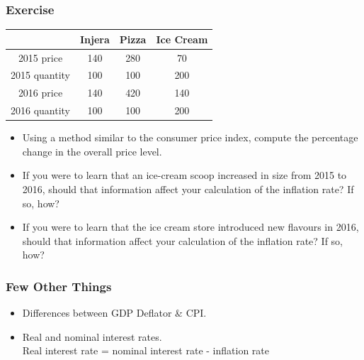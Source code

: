\documentclass[shownotes,11pt, aspectratio=169]{beamer}
\begin{document}
\begin{frame}
\frametitle{Exercise}
\linespread{1}
\begin{center}
\begin{tabular}{ cccc } 
 \hline
  & Injera & Pizza & Ice Cream \\
\hline
2015 price & 140 & 280 & 70 \\
2015 quantity & 100 & 100 & 200 \\
2016 price & 140 & 420 & 140  \\
2016 quantity & 100 & 100 & 200 \\
 \hline
\end{tabular}
\end{center}

\begin{itemize}
\item Using a method similar to the consumer price
index, compute the percentage change in the
overall price level. 

\item If you were to learn that an ice-cream scoop
increased in size from 2015 to 2016, should
that information affect your calculation of the
inflation rate? If so, how?

\item If you were to learn that the ice cream store introduced
new flavours in 2016, should that information
affect your calculation of the inflation rate? If
so, how?
\end{itemize}

\end{frame}



\begin{frame}
\frametitle{Few Other Things}
\begin{itemize}
\item Differences between GDP Deflator \& CPI. 
\pause
\item Real and nominal interest rates. \\
 Real interest rate = nominal interest rate - inflation rate
\end{itemize}
\end{frame}
\end{document}
